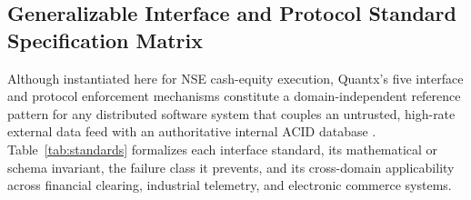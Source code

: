 \documentclass[journal,onecolumn,10pt]{IEEEtran}
\begin{document}
\subsection{Generalizable Interface and Protocol Standard Specification Matrix}
Although instantiated here for NSE cash-equity execution, Quantx's five interface and protocol enforcement mechanisms constitute a domain-independent reference pattern for any distributed software system that couples an untrusted, high-rate external data feed with an authoritative internal ACID database \cite{rath2023,fresnoaranda2024,parsa2025}. Table~\ref{tab:standards} formalizes each interface standard, its mathematical or schema invariant, the failure class it prevents, and its cross-domain applicability across financial clearing, industrial telemetry, and electronic commerce systems.
\end{document}
